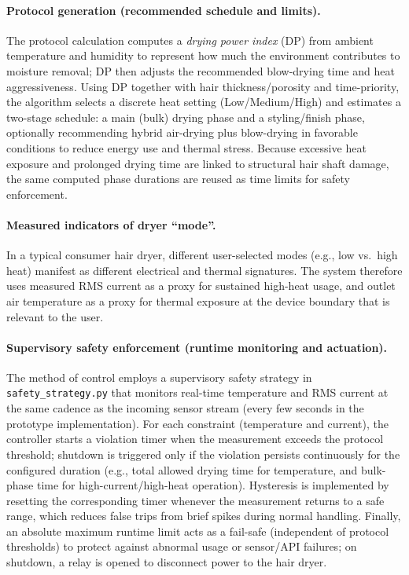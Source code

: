 \documentclass[11pt,a4paper]{article}
\begin{document}
\paragraph{Protocol generation (recommended schedule and limits).}
The protocol calculation computes a \emph{drying power index} (DP) from ambient temperature and humidity to represent how much the environment contributes to moisture removal; DP then adjusts the recommended blow-drying time and heat aggressiveness. Using DP together with hair thickness/porosity and time-priority, the algorithm selects a discrete heat setting (Low/Medium/High) and estimates a two-stage schedule: a main (bulk) drying phase and a styling/finish phase, optionally recommending hybrid air-drying plus blow-drying in favorable conditions to reduce energy use and thermal stress.
Because excessive heat exposure and prolonged drying time are linked to structural hair shaft damage, the same computed phase durations are reused as time limits for safety enforcement. %

\paragraph{Measured indicators of dryer ``mode''.}
In a typical consumer hair dryer, different user-selected modes (e.g., low vs.\ high heat) manifest as different electrical and thermal signatures.
The system therefore uses measured RMS current as a proxy for sustained high-heat usage, and outlet air temperature as a proxy for thermal exposure at the device boundary that is relevant to the user. 

\paragraph{Supervisory safety enforcement (runtime monitoring and actuation).}
The method of control employs a supervisory safety strategy in \texttt{safety\_strategy.py} that monitors real-time temperature and RMS current at the same cadence as the incoming sensor stream (every few seconds in the prototype implementation).
For each constraint (temperature and current), the controller starts a violation timer when the measurement exceeds the protocol threshold; shutdown is triggered only if the violation persists continuously for the configured duration (e.g., total allowed drying time for temperature, and bulk-phase time for high-current/high-heat operation).
Hysteresis is implemented by resetting the corresponding timer whenever the measurement returns to a safe range, which reduces false trips from brief spikes during normal handling.
Finally, an absolute maximum runtime limit acts as a fail-safe (independent of protocol thresholds) to protect against abnormal usage or sensor/API failures; on shutdown, a relay is opened to disconnect power to the hair dryer.
\end{document}
